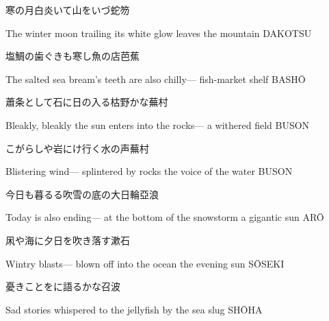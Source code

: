 \begin{haiku}
    {\FH 寒の月白炎いて山をいづ}\hfill{\FH 蛇笏}

    \vin{} The winter moon
    \vin{} \vin{} trailing its white glow
    \vin{} \vin{} \vin{} leaves the mountain \hspace{\fill} DAKOTSU
\end{haiku}

\begin{haiku}
    {\FH 塩鯛の歯ぐきも寒し魚の店}\hfill{\FH 芭蕉}

    \vin{} The salted sea bream's
    \vin{} \vin{} teeth are also chilly---
    \vin{} \vin{} \vin{} fish-market shelf \hspace{\fill} BASH\={O}
\end{haiku}

\begin{haiku}
    {\FH 蕭条として石に日の入る枯野かな}\hfill{\FH 蕪村}

    \vin{} Bleakly, bleakly
    \vin{} \vin{} the sun enters into the rocks---
    \vin{} \vin{} \vin{} a withered field \hspace{\fill} BUSON
\end{haiku}

\begin{haiku}
    {\FH こがらしや岩にけ行く水の声}\hfill{\FH 蕪村}

    \vin{} Blistering wind---
    \vin{} \vin{} splintered by rocks
    \vin{} \vin{} \vin{} the voice of the water \hspace{\fill} BUSON
\end{haiku}

\begin{haiku}
    {\FH 今日も暮るる吹雪の底の大日輪}\hfill{\FH 亞浪}

    \vin{} Today is also ending---
    \vin{} \vin{} at the bottom of the snowstorm
    \vin{} \vin{} \vin{} a gigantic sun \hspace{\fill} AR\={O}
\end{haiku}

\begin{haiku}
    {\FH 凩や海に夕日を吹き落す}\hfill{\FH 漱石}

    \vin{} Wintry blasts---
    \vin{} \vin{} blown off into the ocean
    \vin{} \vin{} \vin{} the evening sun \hspace{\fill} S\={O}SEKI
\end{haiku}

\begin{haiku}
    {\FH 憂きことをに語るかな}\hfill{\FH 召波}

    \vin{} Sad stories
    \vin{} \vin{} whispered to the jellyfish
    \vin{} \vin{} \vin{} by the sea slug \hspace{\fill} SH\={O}HA
\end{haiku}

